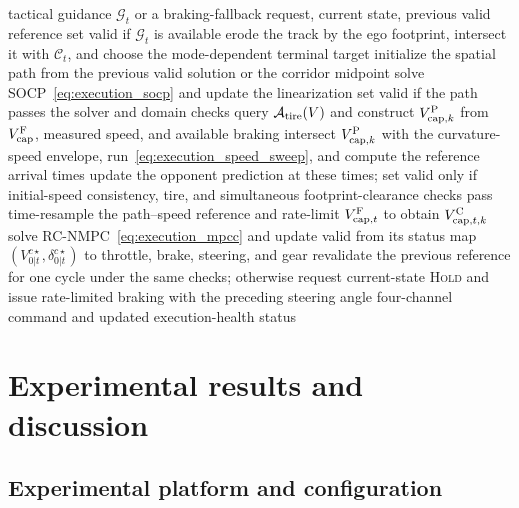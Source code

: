 \documentclass[journal,twoside,web]{ieeecolor}
\begin{document}
\begin{algorithm}[!tbp]
\caption{Sequential SOCP and RC-NMPC Execution}
\label{alg:executor}
\footnotesize
\begin{algorithmic}[1]
\REQUIRE tactical guidance \(\mathcal G_t\) or a braking-fallback request,
current state, previous valid reference
\STATE set valid if $\mathcal G_t$ is available
\STATE erode the track by the ego footprint, intersect it with $\mathcal C_t$,
and choose the mode-dependent terminal target
\STATE initialize the spatial path from the previous valid solution or the
corridor midpoint
\STATE solve SOCP~\eqref{eq:execution_socp} and update the linearization
\ENDFOR
\STATE set valid if the path passes the solver and domain checks
\ENDIF
{}
\STATE query $\mathcal A_{\rm tire}(V)$ and construct
$V_{{\rm cap},k}^{\rm P}$ from $V_{\rm cap}^{\rm F}$, measured speed, and
available braking
\STATE intersect $V_{{\rm cap},k}^{\rm P}$ with the curvature-speed envelope,
run~\eqref{eq:execution_speed_sweep}, and compute the reference arrival times
\STATE update the opponent prediction at these times; set valid only if
initial-speed consistency, tire, and simultaneous footprint-clearance checks pass
\ENDIF
{}
\STATE time-resample the path--speed reference and rate-limit
$V_{{\rm cap},t}^{\rm F}$ to obtain $V_{{\rm cap},t,k}^{\rm C}$
\STATE solve RC-NMPC~\eqref{eq:execution_mpcc} and update valid from its status
\ENDIF
{}
\STATE map $(V_{0|t}^{c\star},\delta_{0|t}^{c\star})$ to throttle, brake,
steering, and gear
\ELSE
\STATE revalidate the previous reference for one cycle under the same checks; otherwise request
current-state \textsc{Hold} and issue rate-limited braking with the preceding
steering angle
\ENDIF
\RETURN four-channel command and updated execution-health status
\end{algorithmic}
\end{algorithm}
\endgroup


\section{Experimental results and discussion}\label{sec:experiments}

\subsection{Experimental platform and configuration}
\label{subsec:hil_env}\label{subsec:param_setup}
\end{document}
